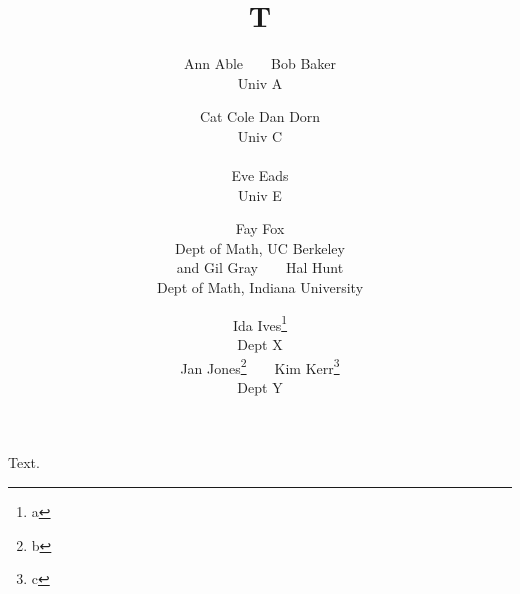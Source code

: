 \documentclass{article}
\title{T}
\author{Ann Able~~~~Bob Baker \\
Univ A
\and Cat Cole \quad Dan Dorn \\
Univ C \\
\\
Eve Eads \\
Univ E
\and Fay Fox \\
Dept of Math, UC Berkeley \\
and Gil Gray~~~~Hal Hunt \\
Dept of Math, Indiana University
\and Ida Ives\thanks{a} \\
Dept X \\
Jan Jones\thanks{b}~~~~Kim Kerr\thanks{c} \\
Dept Y}
\begin{document}
\maketitle
Text.
\end{document}
